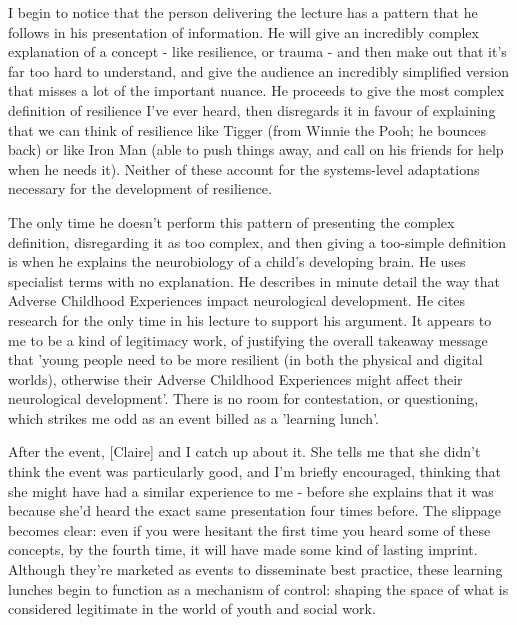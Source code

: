 I begin to notice that the person delivering the lecture has a pattern that he follows in his presentation of information. He will give an incredibly complex explanation of a concept - like resilience, or trauma - and then make out that it's far too hard to understand, and give the audience an incredibly simplified version that misses a lot of the important nuance. He proceeds to give the most complex definition of resilience I've ever heard, then disregards it in favour of explaining that we can think of resilience like Tigger (from Winnie the Pooh; he bounces back) or like Iron Man (able to push things away, and call on his friends for help when he needs it). Neither of these account for the systems-level adaptations necessary for the development of resilience.

The only time he doesn't perform this pattern of presenting the complex definition, disregarding it as too complex, and then giving a too-simple definition is when he explains the neurobiology of a child's developing brain. He uses specialist terms with no explanation. He describes in minute detail the way that Adverse Childhood Experiences impact neurological development. He cites research for the only time in his lecture to support his argument. It appears to me to be a kind of legitimacy work, of justifying the overall takeaway message that 'young people need to be more resilient (in both the physical and digital worlds), otherwise their Adverse Childhood Experiences might affect their neurological development'. There is no room for contestation, or questioning, which strikes me odd as an event billed as a 'learning lunch'.

After the event, [Claire] and I catch up about it. She tells me that she didn't think the event was particularly good, and I'm briefly encouraged, thinking that she might have had a similar experience to me - before she explains that it was because she'd heard the exact same presentation four times before. The slippage becomes clear: even if you were hesitant the first time you heard some of these concepts, by the fourth time, it will have made some kind of lasting imprint. Although they're marketed as events to disseminate best practice, these learning lunches begin to function as a mechanism of control: shaping the space of what is considered legitimate in the world of youth and social work. 

